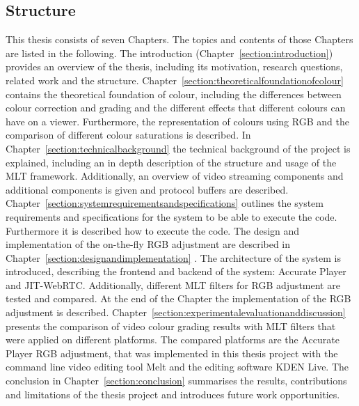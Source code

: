 \documentclass[../MasterThesis.tex]{subfiles}
\begin{document}
	\subsection{Structure} \label{subsection:structure}
	
	This thesis consists of seven Chapters. The topics and contents of those Chapters are listed in the following.
	The introduction (Chapter~\ref{section:introduction}) provides an overview of the thesis, including its motivation, research questions, related work and the structure.
	Chapter~\ref{section:theoreticalfoundationofcolour} contains the theoretical foundation of colour, including the differences between colour correction and grading and the different effects that different colours can have on a viewer. Furthermore, the representation of colours using RGB and the comparison of different colour saturations is described.
	In Chapter~\ref{section:technicalbackground} the technical background of the project is explained, including an in depth description of the structure and usage of the MLT framework. Additionally, an overview of video streaming components and additional components is given and protocol buffers are described.
	Chapter~\ref{section:systemrequirementsandspecifications} outlines the system requirements and specifications for the system to be able to execute the code. Furthermore it is described how to execute the code.
	The design and implementation of the on-the-fly RGB adjustment are described in Chapter~\ref{section:designandimplementation} . The architecture of the system is introduced, describing the frontend and backend of the system: Accurate Player and JIT-WebRTC. Additionally, different MLT filters for RGB adjustment are tested and compared. At the end of the Chapter the implementation of the RGB adjustment is described.
	Chapter~\ref{section:experimentalevaluationanddiscussion} presents the comparison of video colour grading results with MLT filters that were applied on different platforms. The compared platforms are the Accurate Player RGB adjustment, that was implemented in this thesis project with the command line video editing tool Melt and the editing software KDEN Live.
	The conclusion in Chapter~\ref{section:conclusion} summarises the results, contributions and limitations of the thesis project and introduces future work opportunities.
		

	
	
	

	
	

	
	
	
\end{document}
